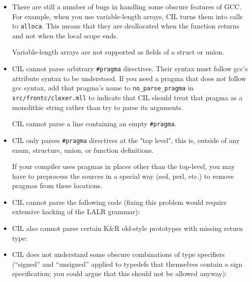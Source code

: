 \documentclass{article}
\def\t#1{{\tt #1}}
\begin{document}
\begin{itemize}
\item There are still a number of bugs in handling some obscure features of
GCC. For example, when you use variable-length arrays, CIL turns them into
calls to \t{alloca}. This means that they are deallocated when the function
returns and not when the local scope ends. 

Variable-length arrays are not supported as fields of a struct or union.

\item CIL cannot parse arbitrary \t{\#pragma} directives.  Their
  syntax must follow gcc's attribute syntax to be understood.  If you
  need a pragma that does not follow gcc syntax, add that pragma's name
  to \t{no\_parse\_pragma} in \t{src/frontc/clexer.mll} to indicate that
  CIL should treat that pragma as a monolithic string rather than try
  to parse its arguments.

  CIL cannot parse a line containing an empty \t{\#pragma}.

\item CIL only parses \t{\#pragma} directives at the "top level", this is,
  outside of any enum, structure, union, or function definitions.

  If your compiler uses pragmas in places other than the top-level,
  you may have to preprocess the sources in a special way (sed, perl,
  etc.) to remove pragmas from these locations.

\item CIL cannot parse the following code (fixing this problem would require
extensive hacking of the LALR grammar):

\item CIL also cannot parse certain K\&R old-style prototypes with missing
return type:

\item CIL does not understand some obscure combinations of type specifiers
(``signed'' and ``unsigned'' applied to typedefs that themselves contain a
sign specification; you could argue that this should not be allowed anyway):


\end{itemize}
\end{document}
